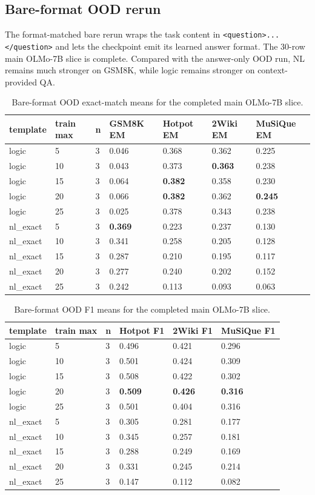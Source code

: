 \documentclass[10pt]{article}
\begin{document}
\subsection{Bare-format OOD rerun}
The format-matched bare rerun wraps the task content in \texttt{<question>...</question>} and lets the checkpoint emit its learned answer format. The 30-row main OLMo-7B slice is complete. Compared with the answer-only OOD run, NL remains much stronger on GSM8K, while logic remains stronger on context-provided QA.

\begin{table}[H]
\centering
\scriptsize
\begin{tabular}{lllllll}
\toprule
template & train max & n & GSM8K EM & Hotpot EM & 2Wiki EM & MuSiQue EM \\
\midrule
logic & 5 & 3 & 0.046 & 0.368 & 0.362 & 0.225 \\
logic & 10 & 3 & 0.043 & 0.373 & \textbf{0.363} & 0.238 \\
logic & 15 & 3 & 0.064 & \textbf{0.382} & 0.358 & 0.230 \\
logic & 20 & 3 & 0.066 & \textbf{0.382} & 0.362 & \textbf{0.245} \\
logic & 25 & 3 & 0.025 & 0.378 & 0.343 & 0.238 \\
nl\_exact & 5 & 3 & \textbf{0.369} & 0.223 & 0.237 & 0.130 \\
nl\_exact & 10 & 3 & 0.341 & 0.258 & 0.205 & 0.128 \\
nl\_exact & 15 & 3 & 0.287 & 0.210 & 0.195 & 0.117 \\
nl\_exact & 20 & 3 & 0.277 & 0.240 & 0.202 & 0.152 \\
nl\_exact & 25 & 3 & 0.242 & 0.113 & 0.093 & 0.063 \\
\bottomrule
\end{tabular}
\caption{Bare-format OOD exact-match means for the completed main OLMo-7B slice.}
\end{table}

\begin{table}[H]
\centering
\scriptsize
\begin{tabular}{llllll}
\toprule
template & train max & n & Hotpot F1 & 2Wiki F1 & MuSiQue F1 \\
\midrule
logic & 5 & 3 & 0.496 & 0.421 & 0.296 \\
logic & 10 & 3 & 0.501 & 0.424 & 0.309 \\
logic & 15 & 3 & 0.508 & 0.422 & 0.302 \\
logic & 20 & 3 & \textbf{0.509} & \textbf{0.426} & \textbf{0.316} \\
logic & 25 & 3 & 0.501 & 0.404 & 0.316 \\
nl\_exact & 5 & 3 & 0.305 & 0.281 & 0.177 \\
nl\_exact & 10 & 3 & 0.345 & 0.257 & 0.181 \\
nl\_exact & 15 & 3 & 0.288 & 0.249 & 0.169 \\
nl\_exact & 20 & 3 & 0.331 & 0.245 & 0.214 \\
nl\_exact & 25 & 3 & 0.147 & 0.112 & 0.082 \\
\bottomrule
\end{tabular}
\caption{Bare-format OOD F1 means for the completed main OLMo-7B slice.}
\end{table}
\end{document}
